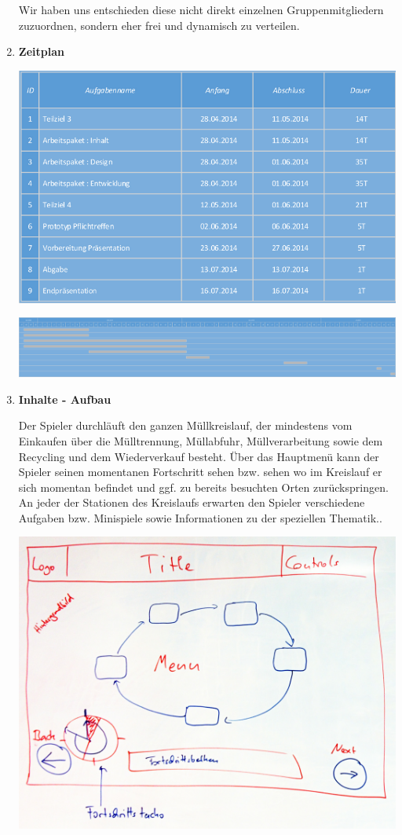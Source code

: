 \documentclass[a4paper]{article}
\newcommand{\TOP}[1]{\item \textbf{#1}\par}
\begin{document}
\begin{enumerate}
Wir haben uns entschieden diese nicht direkt einzelnen Gruppenmitgliedern zuzuordnen, sondern eher frei und dynamisch zu verteilen.

\newpage

\TOP{Zeitplan}

\includegraphics[width=\linewidth]{zeitplan_1}

\includegraphics[width=\linewidth]{zeitplan_2}


\TOP{Inhalte - Aufbau}

Der Spieler durchläuft den ganzen Müllkreislauf, der mindestens vom Einkaufen über die Mülltrennung, Müllabfuhr, Müllverarbeitung sowie dem Recycling und dem Wiederverkauf besteht.
Über das Hauptmenü kann der Spieler seinen momentanen Fortschritt sehen bzw. sehen wo im Kreislauf er sich momentan befindet und ggf. zu bereits besuchten Orten zurückspringen.
An jeder der Stationen des Kreislaufs erwarten den Spieler verschiedene Aufgaben bzw. Minispiele sowie Informationen zu der speziellen Thematik..

\begin{center}
\includegraphics[width=.8\linewidth]{../mockups/menu}
\end{center}



\end{enumerate}
\end{document}

